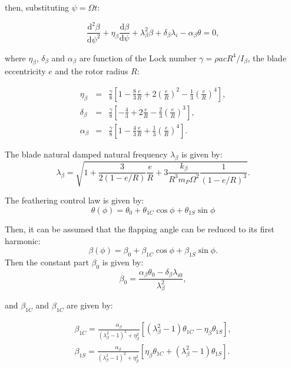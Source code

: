   \noindent
  then, substituting $\psi = \Omega t$:

  \begin{equation}
    \frac{\mathrm{d}^2\beta}{\mathrm{d}\psi^2} + \eta_\beta \frac{\mathrm{d}\beta}{\mathrm{d}\psi} + \lambda_\beta^2\beta + \delta_\beta \lambda_i - \alpha_\beta \theta = 0,
  \end{equation}

  \noindent
  where $\eta_\beta$, $\delta_\beta$ and $\alpha_\beta$ are function of the Lock number $\gamma = \rho a c R^4 / I_\beta$, the blade eccentricity $e$ and the rotor radius $R$:

  \begin{eqnarray}
    \eta_\beta &=& \frac{\gamma}{8} \left[ 1 - \frac{8}{3}\frac{e}{R} + 2 \left(\frac{e}{R}\right)^2 - \frac{1}{3}\left(\frac{e}{R}\right)^4 \right], \\[6pt]
    \delta_\beta &=& \frac{\gamma}{8} \left[- \frac{4}{3} + 2 \frac{e}{R} - \frac{2}{3}\left(\frac{e}{R}\right)^3 \right], \\[6pt]
    \alpha_\beta &=& \frac{\gamma}{8} \left[1 - \frac{4}{3} \frac{e}{R} + \frac{1}{3}\left(\frac{e}{R}\right)^4 \right].
  \end{eqnarray}

  \noindent %
  The blade natural damped natural frequency $\lambda_\beta$ is given by:$$\lambda_\beta = \sqrt{  1 + \frac{3}{2(1 - e/R)}\frac{e}{R} + 3 \frac{k_\beta}{R^3 m_P \Omega^2} \frac{1}{(1 - e/R)^3} }.$$ 
  
  \noindent
  The feathering control law is given by: $$ \theta(\phi) = \theta_0 + \theta_{1C}\cos{\phi} + \theta_{1S}\sin{\phi}$$

  Then, it can be assumed that the flapping angle can be reduced to its first harmonic: $$\beta(\phi) = \beta_0 + \beta_{1C}\cos{\phi} + \beta_{1S}\sin{\phi}.$$ Then the constant part $\beta_0$ is given by: $$\beta_0 = \frac{\alpha_\beta \theta_0 - \delta_\beta \lambda_{i0}}{\lambda_\beta^2},$$

  \noindent
  and $\beta_{1C}$ and $\beta_{1C}$ are given by:

  \begin{eqnarray}
    \beta_{1C} = \frac{\alpha_\beta}{(\lambda_\beta^2 - 1)^2 + \eta_\beta^2} [(\lambda_\beta^2 - 1)\theta_{1C} - \eta_\beta \theta_{1S}], \\[6pt]
    \beta_{1S} = \frac{\alpha_\beta}{(\lambda_\beta^2 - 1)^2 + \eta_\beta^2} [\eta_\beta \theta_{1C} + (\lambda_\beta^2 - 1)\theta_{1S}].
  \end{eqnarray}

